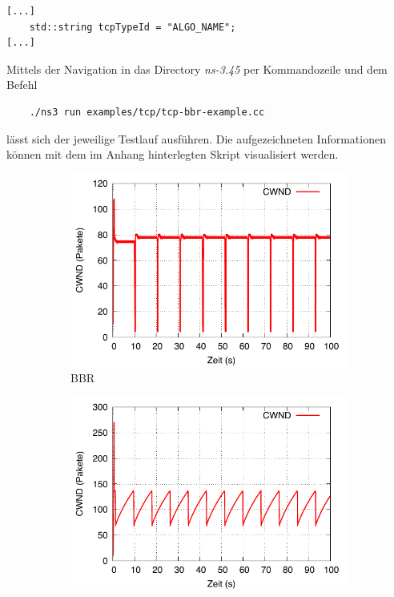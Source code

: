 \documentclass[paper=a4,fontsize=12pt,ngerman]{scrartcl}
\begin{document}
\small
\begin{verbatim}
[...]
    std::string tcpTypeId = "ALGO_NAME";     
[...]
\end{verbatim}
Mittels der Navigation in das Directory \textit{ns-3.45} per Kommandozeile und dem Befehl
\small
\begin{verbatim}
    ./ns3 run examples/tcp/tcp-bbr-example.cc
\end{verbatim}
lässt sich der jeweilige Testlauf ausführen.
 Die aufgezeichneten Informationen können mit dem im Anhang hinterlegten Skript visualisiert werden.


\begin{figure}[H]
    \centering

    \begin{subfigure}{0.40\textwidth}

        \includegraphics[width=\linewidth]{graphics/bbrCW.pdf}
        \caption{BBR}
        \label{fig:bbr}
    \end{subfigure}
    \hfill
    \begin{subfigure}{0.40\textwidth}
        \includegraphics[width=\linewidth]{graphics/newRenoCW.pdf}

\end{subfigure}
\end{figure}
\end{document}

